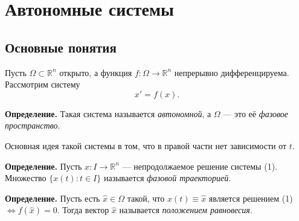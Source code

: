 \graphicspath{{./figures}}

\section{Автономные системы}
\subsection{Основные понятия}
Пусть $\Omega \subset \mathbb R^n$ открыто, а функция $f\colon \Omega \to \mathbb R^n$ непрерывно дифференцируема.
Рассмотрим систему
\begin{equation}
    x' = f(x).
\end{equation}

\textbf{Определение.} Такая система называется \textit{автономной}, а $\Omega$ --- это её \textit{фазовое пространство}.

Основная идея такой системы в том, что в правой части нет зависимости от $t$.

\textbf{Определение.} Пусть $x\colon I \to \mathbb R^n$ --- непродолжаемое решение системы (1).
Множество $\{x(t): t \in I\}$ называется \textit{фазовой траекторией}.

\textbf{Определение.} Пусть есть $\widehat x \in \Omega$ такой, что $x(t) \equiv \widehat x$ является решением (1) $\Leftrightarrow f(\widehat x) = 0$.
Тогда вектор $\widehat x$ называется \textit{положением равновесия}.

